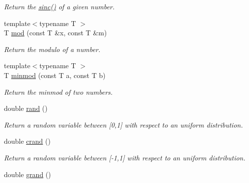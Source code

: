 \begin{DoxyCompactItemize}
\begin{DoxyCompactList}\small\item\em Return the \hyperlink{namespacecimg__library_1_1cimg_ac63d9541ded9f3976b33abf91359cc96}{sinc()} of a given number. \item\end{DoxyCompactList}\item 
{\footnotesize template$<$typename T $>$ }\\T \hyperlink{namespacecimg__library_1_1cimg_a85970edf9afb3b48c0715fadf917854e}{mod} (const T \&x, const T \&m)
\begin{DoxyCompactList}\small\item\em Return the modulo of a number. \item\end{DoxyCompactList}\item 
{\footnotesize template$<$typename T $>$ }\\T \hyperlink{namespacecimg__library_1_1cimg_ae2bab18e9272641210d8b2d7e4a4503f}{minmod} (const T a, const T b)
\begin{DoxyCompactList}\small\item\em Return the minmod of two numbers. \item\end{DoxyCompactList}\item 
\hypertarget{namespacecimg__library_1_1cimg_af31db729637ea4dad61e49e5729839c4}{
double \hyperlink{namespacecimg__library_1_1cimg_af31db729637ea4dad61e49e5729839c4}{rand} ()}
\label{namespacecimg__library_1_1cimg_af31db729637ea4dad61e49e5729839c4}

\begin{DoxyCompactList}\small\item\em Return a random variable between \mbox{[}0,1\mbox{]} with respect to an uniform distribution. \item\end{DoxyCompactList}\item 
\hypertarget{namespacecimg__library_1_1cimg_aae82972570fdc0904d4f03df7b5d3023}{
double \hyperlink{namespacecimg__library_1_1cimg_aae82972570fdc0904d4f03df7b5d3023}{crand} ()}
\label{namespacecimg__library_1_1cimg_aae82972570fdc0904d4f03df7b5d3023}

\begin{DoxyCompactList}\small\item\em Return a random variable between \mbox{[}-\/1,1\mbox{]} with respect to an uniform distribution. \item\end{DoxyCompactList}\item 
\hypertarget{namespacecimg__library_1_1cimg_a0341a323738439349625b2de5f35bb4c}{
double \hyperlink{namespacecimg__library_1_1cimg_a0341a323738439349625b2de5f35bb4c}{grand} ()}
\label{namespacecimg__library_1_1cimg_a0341a323738439349625b2de5f35bb4c}


\end{DoxyCompactItemize}

